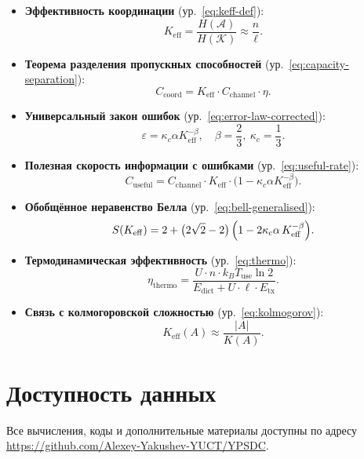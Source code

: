 \documentclass[12pt,a4paper]{article}
\theoremstyle{remark}
\newcommand{\Keff}{K_{\mathrm{eff}}}
\begin{document}
	\begin{itemize}
		\item \textbf{Эффективность координации} (ур.~\eqref{eq:keff-def}):
		\[
		\Keff = \frac{H(\mathcal{A})}{H(\mathcal{K})} \approx \frac{n}{\ell}.
		\]
		
		\item \textbf{Теорема разделения пропускных способностей} (ур.~\eqref{eq:capacity-separation}):
		\[
		C_{\text{coord}} = \Keff \cdot C_{\text{channel}} \cdot \eta.
		\]
		
		\item \textbf{Универсальный закон ошибок} (ур.~\eqref{eq:error-law-corrected}):
		\[
		\varepsilon = \kappa_c \alpha K_{\mathrm{eff}}^{-\beta}, \quad \beta = \frac{2}{3},\ \kappa_c = \frac{1}{3}.
		\]
		
		\item \textbf{Полезная скорость информации с ошибками} (ур.~\eqref{eq:useful-rate}):
		\[
		C_{\text{useful}} = C_{\text{channel}} \cdot \Keff \cdot \bigl(1 - \kappa_c \alpha K_{\mathrm{eff}}^{-\beta}\bigr).
		\]
		
		\item \textbf{Обобщённое неравенство Белла} (ур.~\eqref{eq:bell-generalised}):
		\[
		S(K_{\mathrm{eff}}) = 2 + \bigl(2\sqrt{2}-2\bigr)\,\Bigl(1 - 2\kappa_c\alpha\,K_{\mathrm{eff}}^{-\beta}\Bigr).
		\]
		
		\item \textbf{Термодинамическая эффективность} (ур.~\eqref{eq:thermo}):
		\[
		\eta_{\text{thermo}} = \frac{U \cdot n \cdot k_B T_{\text{use}} \ln 2}{E_{\text{dict}} + U \cdot \ell \cdot E_{\text{tx}}}.
		\]
		
		\item \textbf{Связь с колмогоровской сложностью} (ур.~\eqref{eq:kolmogorov}):
		\[
		\Keff(A) \approx \frac{|A|}{K(A)}.
		\]
	\end{itemize}
	
	\section*{Доступность данных}
	
	Все вычисления, коды и дополнительные материалы доступны по адресу \url{https://github.com/Alexey-Yakushev-YUCT/YPSDC}.
	
\end{document}
